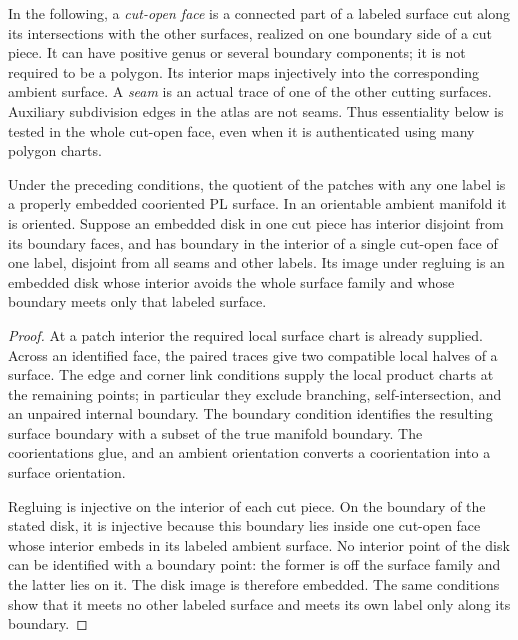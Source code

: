 In the following, a \emph{cut-open face} is a connected part of a labeled
surface cut along its intersections with the other surfaces, realized on
one boundary side of a cut piece.  It can have positive genus or several
boundary components; it is not required to be a polygon.  Its interior
maps injectively into the corresponding ambient surface.  A \emph{seam}
is an actual trace of one of the other cutting surfaces.  Auxiliary
subdivision edges in the atlas are not seams.  Thus essentiality below is
tested in the whole cut-open face, even when it is authenticated using
many polygon charts.

\begin{lemma}
\label{lem:seam-atlas}
Under the preceding conditions, the quotient of the patches with any one
label is a properly embedded cooriented PL surface.  In an orientable
ambient manifold it is oriented.  Suppose an embedded disk in one cut
piece has interior disjoint from its boundary faces, and has boundary in
the interior of a single cut-open face of one label, disjoint from
all seams and other labels.  Its image under regluing is an embedded disk
whose interior avoids the whole surface family and whose boundary meets
only that labeled surface.
\end{lemma}

\begin{proof}
At a patch interior the required local surface chart is already supplied.
Across an identified face, the paired traces give two compatible local
halves of a surface.  The edge and corner link conditions supply the local
product charts at the remaining points; in particular they exclude
branching, self-intersection, and an unpaired internal boundary.  The
boundary condition identifies the resulting surface boundary with a subset
of the true manifold boundary.  The coorientations glue, and an ambient
orientation converts a coorientation into a surface orientation.

Regluing is injective on the interior of each cut piece.  On the boundary
of the stated disk, it is injective because this boundary lies inside one
cut-open face whose interior embeds in its labeled ambient surface.
No interior point of the
disk can be identified with a boundary point: the former is off the
surface family and the latter lies on it.  The disk image is therefore
embedded.  The same conditions show that it meets no other labeled
surface and meets its own label only along its boundary.
\end{proof}

